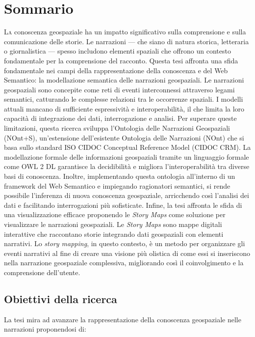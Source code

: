 \chapter*{Sommario}
\lettrine{L}{a} conoscenza geospaziale ha un impatto significativo sulla comprensione e sulla comunicazione delle storie. Le narrazioni — che siano di natura storica, letteraria o giornalistica — spesso includono elementi spaziali che offrono un contesto fondamentale per la comprensione del racconto. Questa tesi affronta una sfida fondamentale nei campi della rappresentazione della conoscenza e del Web Semantico: la modellazione semantica delle narrazioni geospaziali. Le narrazioni geospaziali sono concepite come reti di eventi interconnessi attraverso legami semantici, catturando le complesse relazioni tra le occorrenze spaziali. I modelli attuali mancano di sufficiente espressività e interoperabilità, il che limita la loro capacità di integrazione dei dati, interrogazione e analisi. Per superare queste limitazioni, questa ricerca sviluppa l'Ontologia delle Narrazioni Geospaziali (NOnt+S), un'estensione dell'esistente Ontologia delle Narrazioni (NOnt) che si basa sullo standard ISO CIDOC Conceptual Reference Model (CIDOC CRM). La modellazione formale delle informazioni geospaziali tramite un linguaggio formale come OWL 2 DL garantisce la decidibilità e migliora l'interoperabilità tra diverse basi di conoscenza. Inoltre, implementando questa ontologia all'interno di un framework del Web Semantico e impiegando ragionatori semantici, si rende possibile l'inferenza di nuova conoscenza geospaziale, arricchendo così l'analisi dei dati e facilitando interrogazioni più sofisticate. Infine, la tesi affronta le sfida di una visualizzazione efficace proponendo le \textit{Story Maps} come soluzione per visualizzare le narrazioni geospaziali. Le \textit{Story Maps} sono mappe digitali interattive che raccontano storie integrando dati geospaziali con elementi narrativi. Lo \textit{story mapping}, in questo contesto, è un metodo per organizzare gli eventi narrativi al fine di creare una visione più olistica di come essi si inseriscono nella narrazione geospaziale complessiva, migliorando così il coinvolgimento e la comprensione dell'utente.

\section*{Obiettivi della ricerca}

La tesi mira ad avanzare la rappresentazione della conoscenza geospaziale nelle narrazioni proponendosi di:

